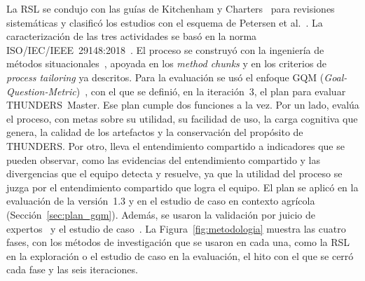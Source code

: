 \documentclass[12pt,letterpaper,oneside]{report}
\begin{document}
La RSL se condujo con las guías de Kitchenham y Charters~\cite{kitchenham2007}
para revisiones sistemáticas y clasificó los estudios con el esquema de Petersen
et al.~\cite{petersen2008systematic}. La caracterización de las tres actividades
se basó en la norma ISO/IEC/IEEE~29148:2018~\cite{iso29148}. El proceso se
construyó con la ingeniería de métodos situacionales~\cite{henderson2010sme},
apoyada en los \textit{method chunks} y en los criterios de \textit{process
tailoring} ya descritos. Para la evaluación se usó el enfoque GQM
(\textit{Goal-Question-Metric})~\cite{basili1994gqm}, con el que se definió, en
la iteración~3, el plan para evaluar THUNDERS~Master. Ese plan cumple dos
funciones a la vez. Por un lado, evalúa el proceso, con metas sobre su utilidad,
su facilidad de uso, la carga cognitiva que genera, la calidad de los artefactos
y la conservación del propósito de THUNDERS. Por otro, lleva el entendimiento
compartido a indicadores que se pueden observar, como las evidencias del
entendimiento compartido y las divergencias que el equipo detecta y resuelve, ya
que la utilidad del proceso se juzga por el entendimiento compartido que logra el
equipo. El plan se aplicó en la evaluación de la versión~1.3 y en el estudio de
caso en contexto agrícola (Sección~\ref{sec:plan_gqm}). Además, se usaron la
validación por juicio de expertos~\cite{escobar2008validez} y el estudio de
caso~\cite{runeson2009case}. La Figura~\ref{fig:metodologia} muestra las cuatro
fases, con los métodos de investigación que se usaron en cada una, como la RSL en
la exploración o el estudio de caso en la evaluación, el hito con el que se cerró
cada fase y las seis iteraciones.
\end{document}
